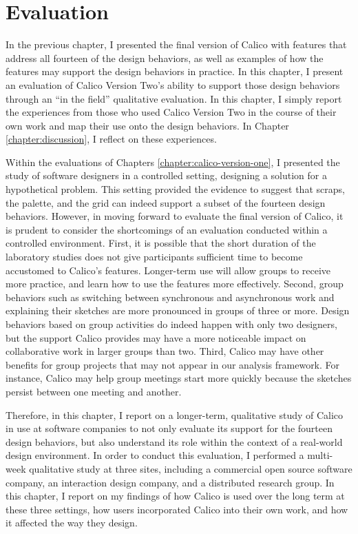\documentclass[12pt,fleqn]{ucithesis}
\begin{document}
 \newpage 
 \newpage \chapter{Evaluation}
\label{chapter:evaluation}

In the previous chapter, I presented the final version of Calico with features that address all fourteen of the design behaviors, as well as examples of how the features may support the design behaviors in practice. In this chapter, I present an evaluation of Calico Version Two's ability to support those design behaviors through an ``in the field'' qualitative evaluation. In this chapter, I simply report the experiences from those who used Calico Version Two in the course of their own work and map their use onto the design behaviors. In Chapter \ref{chapter:discussion}, I reflect on these experiences.

Within the evaluations of Chapters \ref{chapter:calico-version-one}, I presented the study of software designers in a controlled setting, designing a solution for a hypothetical problem. This setting provided the evidence to suggest that scraps, the palette, and the grid can indeed support a subset of the fourteen design behaviors. However, in moving forward to evaluate the final version of Calico, it is prudent to consider the shortcomings of an evaluation conducted within a controlled environment. First, it is possible that the short duration of the laboratory studies does not give participants sufficient time to become accustomed to Calico's features. Longer-term use will allow groups to receive more practice, and learn how to use the features more effectively. Second, group behaviors such as switching between synchronous and asynchronous work and explaining their sketches are more pronounced in groups of three or more. Design behaviors based on group activities do indeed happen with only two designers, but the support Calico provides may have a more noticeable impact on collaborative work in larger groups than two. Third, Calico may have other benefits for group projects that may not appear in our analysis framework. For instance, Calico may help group meetings start more quickly because the sketches persist between one meeting and another.

Therefore, in this chapter, I report on a longer-term, qualitative study of Calico in use at software companies to not only evaluate its support for the fourteen design behaviors, but also understand its role within the context of a real-world design environment. In order to conduct this evaluation, I performed a multi-week qualitative study at three sites, including a commercial open source software company, an interaction design company, and a distributed research group. In this chapter, I report on my findings of how Calico is used over the long term at these three settings, how users incorporated Calico into their own work, and how it affected the way they design.
\end{document}
